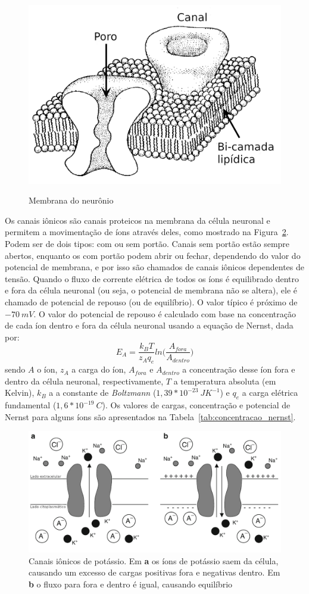 \begin{figure}[tb]
	\centering
	\caption[Membrana do neurônio]{Membrana do neurônio}
	\includegraphics[width=0.55\linewidth]{figs/membrana_neuronio}
	\label{fig:membrananeuronio}
\end{figure}

Os canais iônicos são canais proteicos na membrana da célula neuronal e permitem a movimentação de íons através deles, como mostrado na Figura~\ref{fig:canaisions}. Podem ser de dois tipos: com ou sem portão. Canais sem portão estão sempre abertos, enquanto os com portão podem abrir ou fechar, dependendo do valor do potencial de membrana, e por isso são chamados de canais iônicos dependentes de tensão. Quando o fluxo de corrente elétrica de todos os íons é equilibrado dentro e fora da célula neuronal (ou seja, o potencial de membrana não se altera), ele é chamado de potencial de repouso (ou de equilíbrio). O valor típico é próximo de $-70\ mV$. O valor do potencial de repouso é calculado com base na concentração de cada íon dentro e fora da célula neuronal usando a equação de Nernst, dada por:
\begin{equation}\label{eq:nernst}
E_A=\frac{k_BT}{z_Aq_e}ln\Big(\frac{A_{fora}}{A_{dentro}}\Big)
\end{equation}
sendo $A$ o íon, $z_A$ a carga do íon, $A_{fora}$ e $A_{dentro}$ a concentração desse íon fora e dentro da célula neuronal, respectivamente, $T$ a temperatura absoluta (em Kelvin), $k_B$ a a constante de \textit{Boltzmann} ($1,39*10^{-23}\ JK^{-1}$) e $q_e$ a carga elétrica fundamental ($1,6*10^{-19}\ C$). Os valores de cargas, concentração e potencial de Nernst para alguns íons são apresentados na Tabela~\ref{tab:concentracao_nernst}.

\begin{figure}[tb!]
	\centering
	\caption[Canais iônicos de potássio]{Canais iônicos de potássio. Em \textbf{a} os íons de potássio saem da célula, causando um excesso de cargas positivas fora e negativas dentro. Em \textbf{b} o fluxo para fora e dentro é igual, causando equilíbrio}
	\label{fig:canaisions}
	\includegraphics[width=0.7\linewidth]{figs/canais_ions}
\end{figure}

